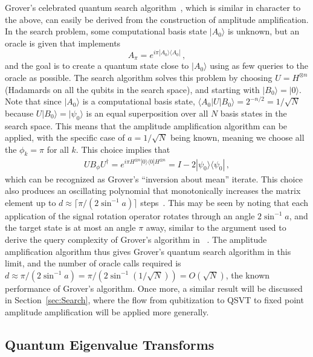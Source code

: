 \documentclass[aps,pra,showpacs,notitlepage,twocolumn,superscriptaddress,nofootinbib]{revtex4-1}
\def\>{\rangle}
\def\<{\langle}
\newcommand{\bea}{\begin{eqnarray}}
\newcommand{\eea}{\end{eqnarray}}
\newcommand{\be}{\begin{equation}}
\newcommand{\ee}{\end{equation}}
\begin{document}
    Grover's celebrated quantum search algorithm~\cite{grover1996fast}, which is similar in character to the above, can easily be derived from the construction of amplitude amplification. In the search problem, some computational basis state $|A_0\>$ is unknown, but an oracle is given that implements
        \be
            A_\pi = e^{i\pi |A_0\>\<A_0|}\,,
        \ee
    and the goal is to create a quantum state close to $|A_0\>$ using as few queries to the oracle as possible.  The search algorithm solves this problem by choosing $U = H^{\otimes n}$ (Hadamards on all the qubits in the search space), and starting with $|B_0\> = |0\>$. Note that since $|A_0\>$ is a computational basis state, $\<A_0 |U|B_0\> = 2^{-n/2} = 1/\sqrt{N}$ because $U|B_0\> = |\psi_0\>$ is an equal superposition over all $N$ basis states in the search space. This means that the amplitude amplification algorithm can be applied, with the specific case of $a=1/\sqrt{N}$ being known, meaning we choose all the $\phi_k = \pi$ for all $k$. This choice implies that 
        \bea
            U B_\phi U^\dagger = e^{i\pi H^{\otimes n} |0\>\<0| H^{\otimes n}} = I - 2|\psi_0\>\<\psi_0|\,,
        \eea
    which can be recognized as Grover's ``inversion about mean'' iterate. This choice also produces an oscillating polynomial that monotonically increases the matrix element up to $d \approx \lceil \pi/(2\sin^{-1} a) \rceil$ steps~\cite{PhysRevLett.113.210501}. This may be seen by noting that each application of the signal rotation operator rotates through an angle $2\sin^{-1} a$, and the target state is at most an angle $\pi$ away, similar to the argument used to derive the query complexity of Grover's algorithm in ~\cite{nielsen2010quantum}. The amplitude amplification algorithm thus gives Grover's quantum search algorithm in this limit, and the number of oracle calls required is $d \approx \pi/(2 \sin^{-1} a) = \pi/(2\sin^{-1}(1/\sqrt{N})) = O(\sqrt{N})$, the known performance of Grover's algorithm. Once more, a similar result will be discussed in Section~\ref{sec:Search}, where the flow from qubitization to QSVT to fixed point amplitude amplification will be applied more generally.


\subsection{Quantum Eigenvalue Transforms}\label{sec:eigenvalue_transforms}
\end{document}
